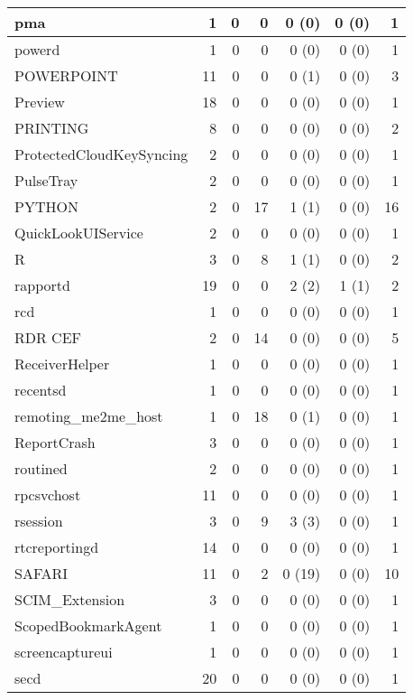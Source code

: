 \begin{adjustwidth}{-2in}{}
\begin{scriptsize}
\begin{longtable}[l]{ l | r | r | r | r | r | r }
    pma &  1 &  0 &  0 &  0 (0) &  0 (0) &  1 \\ \hline
    powerd & 1 &  0 &  0 &  0 (0) &  0 (0) &  1 \\ \hline
    POWERPOINT &  11 &  0 &  0 &  0 (1) &  0 (0) &  3 \\ \hline
    Preview & 18 &  0 &  0 &  0 (0) &  0 (0) &  1 \\ \hline
    PRINTING & 8 &  0 &  0 &  0 (0) &  0 (0) &  2 \\ \hline
    ProtectedCloudKeySyncing & 2 &  0 &  0 &  0 (0) &  0 (0) &  1 \\ \hline
    PulseTray &  2 &  0 &  0 &  0 (0) &  0 (0) &  1 \\ \hline
    PYTHON & 2 &  0 & 17 &  1 (1) &  0 (0) & 16 \\ \hline
    QuickLookUIService & 2 &  0 &  0 &  0 (0) &  0 (0) &  1 \\ \hline
    R &  3 &  0 &  8 &  1 (1) &  0 (0) &  2 \\ \hline
    rapportd &  19 &  0 &  0 &  2 (2) &  1 (1) &  2 \\ \hline
    rcd &  1 &  0 &  0 &  0 (0) &  0 (0) &  1 \\ \hline
    RDR CEF &  2 &  0 & 14 &  0 (0) &  0 (0) &  5 \\ \hline
    ReceiverHelper & 1 &  0 &  0 &  0 (0) &  0 (0) &  1 \\ \hline
    recentsd & 1 &  0 &  0 &  0 (0) &  0 (0) &  1 \\ \hline
    remoting\_me2me\_host &  1 &  0 & 18 &  0 (1) &  0 (0) &  1 \\ \hline
    ReportCrash &  3 &  0 &  0 &  0 (0) &  0 (0) &  1 \\ \hline
    routined & 2 &  0 &  0 &  0 (0) &  0 (0) &  1 \\ \hline
    rpcsvchost &  11 &  0 &  0 &  0 (0) &  0 (0) &  1 \\ \hline
    rsession & 3 &  0 &  9 &  3 (3) &  0 (0) &  1 \\ \hline
    rtcreportingd & 14 &  0 &  0 &  0 (0) &  0 (0) &  1 \\ \hline
    SAFARI &  11 &  0 &  2 & 0 (19) &  0 (0) & 10 \\ \hline
    SCIM\_Extension & 3 &  0 &  0 &  0 (0) &  0 (0) &  1 \\ \hline
    ScopedBookmarkAgent &  1 &  0 &  0 &  0 (0) &  0 (0) &  1 \\ \hline
    screencaptureui &  1 &  0 &  0 &  0 (0) &  0 (0) &  1 \\ \hline
    secd &  20 &  0 &  0 &  0 (0) &  0 (0) &  1 \\ \hline

\end{longtable}
\end{scriptsize}
\end{adjustwidth}
